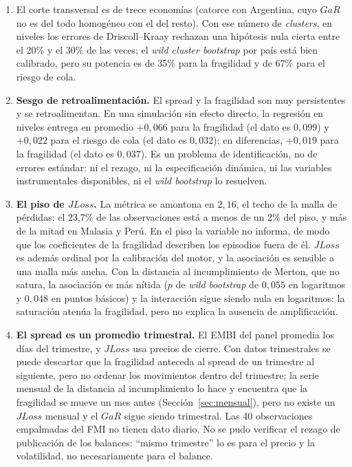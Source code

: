 \begin{enumerate}
\item El corte transversal es de trece economías (catorce con Argentina, cuyo $GaR$ no es del todo homogéneo con el del resto). Con ese número de \textit{clusters}, en niveles los errores de Driscoll--Kraay rechazan una hipótesis nula cierta entre el 20\% y el 30\% de las veces; el \textit{wild cluster bootstrap} por país está bien calibrado, pero su potencia es de 35\% para la fragilidad y de 67\% para el riesgo de cola.
\item \textbf{Sesgo de retroalimentación.} El spread y la fragilidad son muy persistentes y se retroalimentan. En una simulación sin efecto directo, la regresión en niveles entrega en promedio $+0{,}066$ para la fragilidad (el dato es $0{,}099$) y $+0{,}022$ para el riesgo de cola (el dato es $0{,}032$); en diferencias, $+0{,}019$ para la fragilidad (el dato es $0{,}037$). Es un problema de identificación, no de errores estándar: ni el rezago, ni la especificación dinámica, ni las variables instrumentales disponibles, ni el \textit{wild bootstrap} lo resuelven.
\item \textbf{El piso de $JLoss$.} La métrica se amontona en $2{,}16$, el techo de la malla de pérdidas: el 23,7\% de las observaciones está a menos de un 2\% del piso, y más de la mitad en Malasia y Perú. En el piso la variable no informa, de modo que los coeficientes de la fragilidad describen los episodios fuera de él. $JLoss$ es además ordinal por la calibración del motor, y la asociación es sensible a una malla más ancha. Con la distancia al incumplimiento de Merton, que no satura, la asociación es más nítida ($p$ de \textit{wild bootstrap} de $0{,}055$ en logaritmos y $0{,}048$ en puntos básicos) y la interacción sigue siendo nula en logaritmos: la saturación atenúa la fragilidad, pero no explica la ausencia de amplificación.
\item \textbf{El spread es un promedio trimestral.} El EMBI del panel promedia los días del trimestre, y $JLoss$ usa precios de cierre. Con datos trimestrales se puede descartar que la fragilidad anteceda al spread de un trimestre al siguiente, pero no ordenar los movimientos dentro del trimestre; la serie mensual de la distancia al incumplimiento lo hace y encuentra que la fragilidad se mueve un mes antes (Sección~\ref{sec:mensual}), pero no existe un $JLoss$ mensual y el $GaR$ sigue siendo trimestral. Las 40 observaciones empalmadas del FMI no tienen dato diario. No se pudo verificar el rezago de publicación de los balances: ``mismo trimestre'' lo es para el precio y la volatilidad, no necesariamente para el balance.

\end{enumerate}
